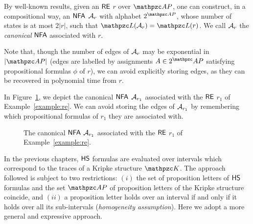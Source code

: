 \begin{remark}\label{remk:nfa}
By well-known results, given an $\mathsf{RE}$ $r$ over $\Prop$, one can construct, in a compositional way, an $\text{\sffamily NFA}$ $\mathcal{A}_r$ with alphabet $2^{\Prop}$, whose number of states is at most $2|r|$, such that $\lang(\Au_r) = \lang(r)$. 
We call $\mathcal{A}_r$ the \emph{canonical} $\text{\sffamily NFA}$ associated with $r$. 

Note that, though the number of edges of $\mathcal{A}_r$ may be exponential in $|\Prop|$ (edges are labelled by assignments $A\in 2^\Prop$
satisfying propositional formulas $\phi$ of $r$), we can avoid explicitly 
storing edges, as they can be recovered in polynomial time from $r$. 

In  
Figure~\ref{fig:NFAex}, we depict the canonical $\text{\sffamily NFA}$ $\mathcal{A}_{r_1}$ associated 
with the $\mathsf{RE}$ $r_1$ of  Example~\ref{example:re}.
We can avoid storing the edges of $\mathcal{A}_{r_1}$ by remembering which propositional formulas of $r_1$ they are associated with.

\begin{figure}[H]
\centering
{}
\caption{The canonical $\text{\sffamily NFA}$ $\mathcal{A}_{r_1}$ associated with the $\mathsf{RE}$ $r_1$ of Example~\ref{example:re}.
}\label{fig:NFAex}
\end{figure}
\end{remark}

In the previous chapters, $\text{\sffamily HS}$ formulas are evaluated over intervals which correspond to the traces of a Kripke structure $\Ku$. The approach followed is subject to two restrictions: $(i)$ the set of  proposition letters of $\text{\sffamily HS}$ formulas and the set $\Prop$ of proposition letters of the  Kripke structure
coincide, and $(ii)$ a proposition letter holds over an interval if and only if it holds over all its sub-intervals (\emph{homogeneity assumption}). 
%
Here we adopt a more general and expressive approach.

